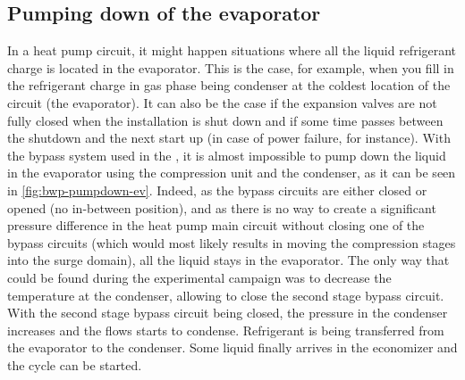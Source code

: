 \subsection{Pumping down of the evaporator}
\label{sec:pump-down-ev}

In a heat pump circuit, it might happen situations where all the
liquid refrigerant charge is located in the evaporator. This is the
case, for example, when you fill in the refrigerant charge in gas
phase being condenser at the coldest location of the circuit (the
evaporator). It can also be the case if the expansion valves are not
fully closed when the installation is shut down and if some time
passes between the shutdown and the next start up (in case of power
failure, for instance). With the bypass system used in the
\AWP{}, it is almost impossible to
pump down the liquid in the evaporator using the compression unit and
the condenser, as it can be seen in
\cref{fig:bwp-pumpdown-ev}. Indeed, as the bypass circuits are either
closed or opened (no in-between position), and as there is no way to
create a significant pressure difference in the heat pump main circuit
without closing one of the bypass circuits (which would most likely
results in moving the compression stages into the surge domain), all
the liquid stays in the evaporator. The only way that could be found
during the experimental campaign was to decrease the temperature at
the condenser, allowing to close the second stage bypass circuit. With
the second stage bypass circuit being closed, the pressure in the
condenser increases and the flows starts to condense. Refrigerant is
being transferred from the evaporator to the condenser. Some liquid
finally arrives in the economizer and the cycle can be started.

